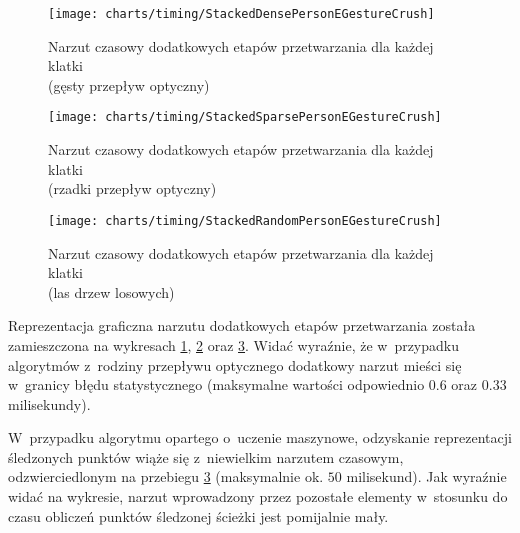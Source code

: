      \begin{figure}[!ht]
        \centering
        \texttt{[image: charts/timing/StackedDensePersonEGestureCrush]}
        \caption[Narzut czasowy dodatkowych etapów przetwarzania dla każdej klatki\\(gęsty przepływ optyczny)]
                {Narzut czasowy dodatkowych etapów przetwarzania dla każdej klatki\\(gęsty przepływ optyczny)}
        \label{fig:StackedDense}
      \end{figure}

      \begin{figure}[!ht]
        \centering
        \texttt{[image: charts/timing/StackedSparsePersonEGestureCrush]}
        \caption[Narzut czasowy dodatkowych etapów przetwarzania dla każdej klatki\\(rzadki przepływ optyczny)]
                {Narzut czasowy dodatkowych etapów przetwarzania dla każdej klatki\\(rzadki przepływ optyczny)}
        \label{fig:StackedSparse}
      \end{figure}

    \newpage
      \begin{figure}[!ht]
        \centering
        \texttt{[image: charts/timing/StackedRandomPersonEGestureCrush]}
        \caption[Narzut czasowy dodatkowych etapów przetwarzania dla każdej klatki\\(las drzew losowych)]
                {Narzut czasowy dodatkowych etapów przetwarzania dla każdej klatki\\(las drzew losowych)}
        \label{fig:StackedRandom}
      \end{figure}

    Reprezentacja graficzna narzutu dodatkowych etapów przetwarzania została zamieszczona na wykresach \ref{fig:StackedDense}, \ref{fig:StackedSparse} oraz \ref{fig:StackedRandom}. Widać wyraźnie, że w~przypadku algorytmów z~rodziny przepływu optycznego dodatkowy narzut mieści się w~granicy błędu statystycznego (maksymalne wartości odpowiednio $0.6$ oraz $0.33$ milisekundy).

    W~przypadku algorytmu opartego o~uczenie maszynowe, odzyskanie reprezentacji śledzonych punktów wiąże się z~niewielkim narzutem czasowym, odzwierciedlonym na przebiegu \ref{fig:StackedRandom} (maksymalnie ok. $50$ milisekund). Jak wyraźnie widać na wykresie, narzut wprowadzony przez pozostałe elementy w~stosunku do czasu obliczeń punktów śledzonej ścieżki jest pomijalnie mały.


